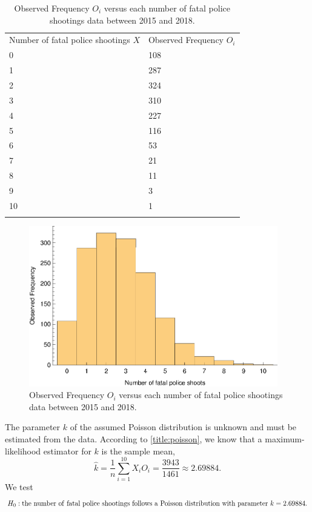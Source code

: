 \documentclass[conf]{new-aiaa}
\begin{document}
\begin{table}[!htbp]
\centering
\begin{tabular}{m{3cm}<{\centering}m{3cm}<{\centering}}
\toprule 
\toprule
Number of fatal police shootings $X$    & Observed Frequency $O_i$ \\
\noalign{\smallskip}\hline\noalign{\smallskip}
0  &   108    \\
1  &   287   \\
2  &   324    \\
3  &   310    \\
4  &   227    \\
5  &   116    \\
6  &   53    \\
7  &   21    \\
8  &   11    \\
9  &   3    \\
10  &  1     \\
\bottomrule 
\bottomrule\smallskip
\end{tabular}
\caption{Observed Frequency $O_i$ versus each number of fatal police shootings data between 2015 and 2018.}
\label{tab:q3-all-obs}
\end{table}

\begin{figure}[!htbp]
\centering
\includegraphics[height=7cm]{q3/q3-all-obs.eps}
\caption{Observed Frequency $O_i$ versus each number of fatal police shootings data between 2015 and 2018.}
\label{fig:q3-all-obs}
\end{figure}

The parameter $k$ of the assumed Poisson distribution is unknown and must be estimated from the data. According to \ref{title:poisson}, we know that a maximum-likelihood estimator for $k$ is the sample mean,
$$\hat{k} = \frac{1}{n}\sum_{i=1}^{10} X_iO_i = \frac{3943}{1461} \approx 2.69884.$$
We test 
$$H_0:{\rm the\ number\ of\ fatal\ police\ shootings\ follows\ a\ Poisson\ distribution\ with\ parameter\ }k = 2.69884.$$
\end{document}
